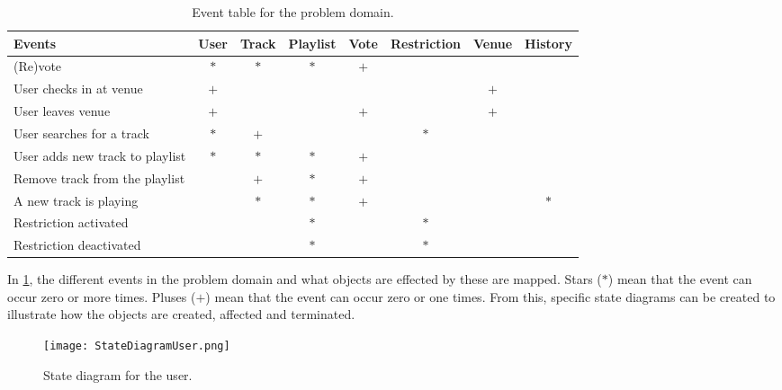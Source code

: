 \begin{table}[htbp]
    \centering
    \tabcolsep=0.10cm
    \begin{tabular}{lccccccc}
        \toprule
        \textbf{Events}                 & User   & Track  & Playlist & Vote   & Restriction & Venue  & History\\
        \midrule
        (Re)vote                        & $\ast$ & $\ast$ &   $\ast$ &   $+$  &             &        &        \\
        User checks in at venue         & $+$    &        &          &        &             & $+$    &        \\
        User leaves venue               & $+$    &        &          &  $+$   &             & $+$    &        \\
        User searches for a track       & $\ast$ &  $+$   &          &        & $\ast$      &        &        \\
        User adds new track to playlist & $\ast$ & $\ast$ & $\ast$   & $+$    &             &        &        \\
        Remove track from the playlist  &        & $+$    & $\ast$   & $+$    &             &        &        \\
        A new track is playing          &        & $\ast$ & $\ast$   & $+$    &             &        & $\ast$ \\
        Restriction activated           &        &        & $\ast$   &        & $\ast$      &        &        \\
        Restriction deactivated         &        &        & $\ast$   &        & $\ast$      &        &        \\
        \bottomrule
    \end{tabular}
    \caption{Event table for the problem domain.}\label{eventtable}
\end{table}

In \cref{eventtable}, the different events in the problem domain and
what objects are effected by these are mapped. Stars ($\ast$) mean that the
event can occur zero or more times. Pluses ($+$) mean that the event can
occur zero or one times. From this, specific state diagrams can be created to illustrate how the objects are created, affected and terminated.

\begin{figure}[H]
  \centering
  \texttt{[image: StateDiagramUser.png]}
  \caption{State diagram for the user.}\label{fig:StateDiagramUser}
\end{figure}

